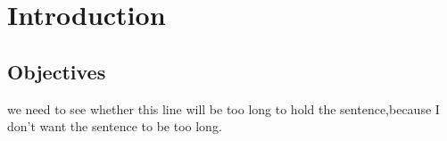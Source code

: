 \documentclass[12pt,a4paper]{article}
\begin{document}
\section{Introduction}
\subsection{Objectives}
we need to see whether this 
line will be too long to hold
 the sentence,because I don't want
the sentence to be too long.
\end{document}
